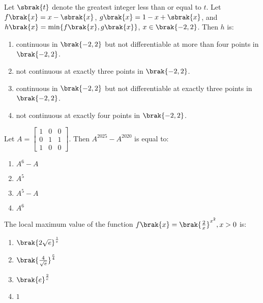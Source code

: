 \iffalse
\title{Assignment}
\author{K.AKSHAY TEJA}
\section{mcq-single}
\fi
\item Let $\sbrak{t}$ denote the greatest integer less than or equal to $t$. Let $f\brak{x} = x - \sbrak{x}$, $g\brak{x} = 1 - x + \sbrak{x}$, and $h\brak{x} = \min\{f\brak{x}, g\brak{x}\}$, $x \in \brak{-2, 2}$. Then $h$ is:  \hfill {}


\begin{enumerate}
    \item continuous in $\brak{-2, 2}$ but not differentiable at more than four points in $\brak{-2, 2}$.
    \item not continuous at exactly three points in $\brak{-2, 2}$.
    \item continuous in $\brak{-2, 2}$ but not differentiable at exactly three points in $\brak{-2, 2}$.
    \item not continuous at exactly four points in $\brak{-2, 2}$.
\end{enumerate}


\item Let $A = \begin{bmatrix} 1 & 0 & 0 \\ 0 & 1 & 1 \\ 1 & 0 & 0 \end{bmatrix}. $
Then $ A^{2025} - A^{2020} $ is equal to:  \hfill {}
\begin{multicols}{4}    
\begin{enumerate}
    \item $ A^6 - A $
    \item $ A^5 $
    \item $ A^5 - A $
    \item $ A^6 $
\end{enumerate}
\end{multicols}


\item The local maximum value of the function $f\brak{x} = \brak{\frac{2}{x}}^{x^2}, x > 0$
is: \hfill {}
\begin{multicols}{4}
    \begin{enumerate}
    \item $ \brak{2\sqrt{e}}^{\frac{1}{e}} $
    \item $ \brak{\frac{4}{\sqrt{e}}}^{\frac{e}{4}} $
    \item $ \brak{e}^{\frac{2}{e}} $
    \item $ 1 $
\end{enumerate}
\end{multicols}


